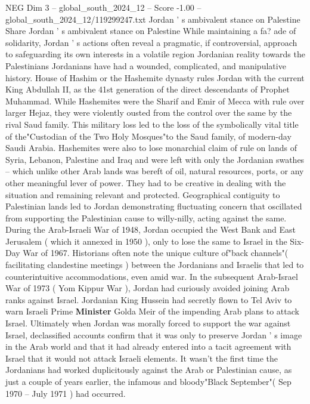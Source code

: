 \begin{textsample}{NEG Dim 3 – global\_south\_2024\_12 – Score -1.00 – global\_south\_2024\_12/119299247.txt}  \label{ex:f3_neg_066}
Jordan ' s ambivalent stance on Palestine Share Jordan ' s ambivalent stance on Palestine While maintaining a fa? ade of solidarity, Jordan ' s actions often reveal a pragmatic, if controversial, approach to safeguarding its own interests in a volatile region Jordanian reality towards the Palestinians Jordanians have had a wounded, complicated, and manipulative history.
House of Hashim or the Hashemite dynasty rules Jordan with the current King Abdullah II, as the 41st generation of the direct descendants of Prophet Muhammad.
While Hashemites were the Sharif and Emir of Mecca with rule over larger Hejaz, they were violently ousted from the control over the same by the rival Saud family.
This military loss led to the loss of the symbolically vital title of the"Custodian of the Two Holy Mosques"to the Saud family, of modern-day Saudi Arabia.
Hashemites were also to lose monarchial claim of rule on lands of Syria, Lebanon, Palestine and Iraq and were left with only the Jordanian swathes -- which unlike other Arab lands was bereft of oil, natural resources, ports, or any other meaningful lever of power.
They had to be creative in dealing with the situation and remaining relevant and protected.
Geographical contiguity to Palestinian lands led to Jordan demonstrating fluctuating concern that oscillated from supporting the Palestinian cause to willy-nilly, acting against the same.
During the Arab-Israeli War of 1948, Jordan occupied the West Bank and East Jerusalem ( which it annexed in 1950 ), only to lose the same to Israel in the Six-Day War of 1967.
Historians often note the unique culture of"back channels"( facilitating clandestine meetings ) between the Jordanians and Israelis that led to counterintuitive accommodations, even amid war.
In the subsequent Arab-Israel War of 1973 ( Yom Kippur War ), Jordan had curiously avoided joining Arab ranks against Israel.
Jordanian King Hussein had secretly flown to Tel Aviv to warn Israeli Prime \textbf{Minister} Golda Meir of the impending Arab plans to attack Israel.
Ultimately when Jordan was morally forced to support the war against Israel, declassified accounts confirm that it was only to preserve Jordan ' s image in the Arab world and that it had already entered into a tacit agreement with Israel that it would not attack Israeli elements.
It wasn't the first time the Jordanians had worked duplicitously against the Arab or Palestinian cause, as just a couple of years earlier, the infamous and bloody"Black September"( Sep 1970 -- July 1971 ) had occurred.

\end{textsample}
